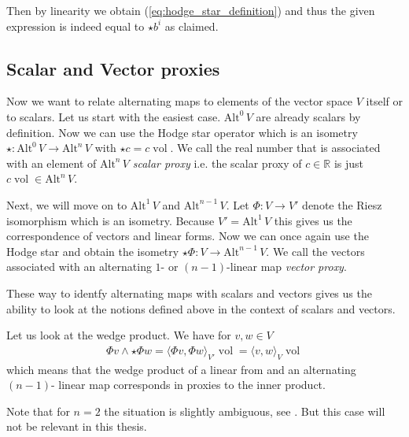 \documentclass[12pt,a4paper]{article}
\numberwithin{equation}{subsection}
\numberwithin{lemma}{subsection}
\theoremstyle{definition}
\DeclareMathOperator{\vol}{vol}
\newcommand{\alternating}[2]{ {\text{Alt}^{#1}\,#2} }
\newcommand{\real}{\mathbb{R}}
\begin{document}
Then by linearity we obtain (\ref{eq:hodge_star_definition}) and thus 
the given expression is indeed equal to $\star b^i$ as claimed.


\subsection{Scalar and Vector proxies} \label{sec:scalar_and_vector_proxies}
Now we want to relate alternating maps to elements of the 
vector space $V$ itself or to scalars. Let us start with the easiest 
case. $\alternating{0}{V}$ are already scalars by definition. Now we can use 
the Hodge star operator which is an isometry 
$\star: \alternating{0}{V} \rightarrow \alternating{n}{V}$ with
$\star c = c \vol$. 
We call the real number that is associated with an element of 
$\alternating{n}{V}$ \textit{scalar proxy} i.e. the scalar proxy of 
$c \in \real$ is just $c \vol \in \alternating{n}{V}$.

Next, we will move on to $\alternating{1}{V}$ and $\alternating{n-1}{V}$. 
Let $\Phi: V \rightarrow V'$ denote the Riesz isomorphism which is an isometry.
Because $V' = \alternating{1}{V}$ this gives us the correspondence of 
vectors and linear forms. Now we can once again use the Hodge star and obtain 
the isometry $\star \Phi: V \rightarrow \alternating{n-1}{V}$. We call 
the vectors associated with an alternating $1$- or $(n-1)$-linear map 
\textit{vector proxy}.

These way to identfy alternating maps with scalars and vectors gives us the 
ability to look at the notions defined above in the context of scalars 
and vectors.

Let us look at the wedge product. We have for $v,w \in V$
\begin{align*}
    \Phi v \wedge \star \Phi w = \langle \Phi v , \Phi w \rangle_{V'} \vol
    = \langle v , w \rangle_{V} \vol
\end{align*}
which means that the wedge product of a linear from and an alternating $(n-1)$-
linear map corresponds in proxies to the inner product.

Note that for $n=2$ the situation 
is slightly ambiguous, see \cite[p.67]{arnold}. But this case will not be
relevant in this thesis. %
\end{document}
